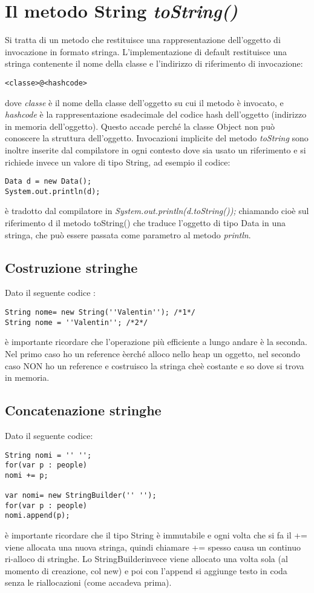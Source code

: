 \section{Il metodo String \textit{toString()}}
Si tratta di un metodo che restituisce una rappresentazione dell'oggetto di invocazione in formato stringa. L'implementazione di default restituisce una stringa contenente il nome della classe e l'indirizzo di riferimento di invocazione:
\begin{lstlisting}
<classe>@<hashcode>
\end{lstlisting}
dove \textit{classe} è il nome della classe dell'oggetto su cui il metodo è invocato, e \textit{hashcode} è la rappresentazione esadecimale del codice hash dell'oggetto (indirizzo in memoria dell'oggetto). Questo accade perché la classe Object non può conoscere la struttura dell'oggetto.
Invocazioni implicite del metodo \textit{toString} sono inoltre inserite dal compilatore in ogni contesto dove sia usato un riferimento e si richiede invece un valore di tipo String, ad esempio il codice:
\begin{lstlisting}
Data d = new Data();
System.out.println(d);
\end{lstlisting}
è tradotto dal compilatore in \textit{System.out.println(d.toString());} chiamando cioè sul riferimento d il metodo toString() che traduce l'oggetto di tipo Data in una stringa, che può essere passata come parametro al metodo \textit{println}.

\subsection{Costruzione stringhe}
Dato il seguente codice :
\begin{lstlisting}
String nome= new String(''Valentin''); /*1*/
String nome = ''Valentin''; /*2*/
\end{lstlisting}
è importante ricordare che l'operazione più efficiente a lungo andare è la seconda. Nel primo caso ho un reference èerché alloco nello heap un oggetto, nel secondo caso NON ho un reference e costruisco la stringa cheè costante e so dove si trova in memoria.

\subsection{Concatenazione stringhe}
Dato il seguente codice:
\begin{lstlisting}
String nomi = '' '';
for(var p : people)
nomi += p;

var nomi= new StringBuilder('' '');
for(var p : people)
nomi.append(p);
\end{lstlisting}
è importante ricordare che il tipo String è immutabile e ogni volta che si fa il += viene allocata una nuova stringa, quindi chiamare += spesso causa un continuo ri-alloco di stringhe. Lo StringBuilderinvece viene allocato una volta sola (al momento di creazione, col new) e poi con l'append si aggiunge testo in coda senza le riallocazioni (come accadeva prima).